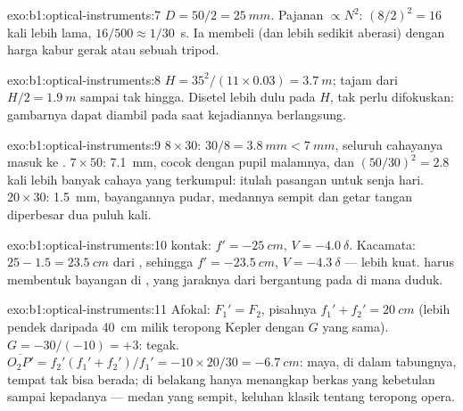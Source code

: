 \begin{solution}{exo:b1:optical-instruments:7}
$D = 50/2 = \qty{25}{mm}$. Pajanan $\propto N^2$: $(8/2)^2 = 16$ kali
lebih lama, $16/500 \approx 1/30$~\unit{s}. Ia membeli 
(dan lebih sedikit aberasi) dengan harga kabur gerak atau sebuah tripod.
\end{solution}

\begin{solution}{exo:b1:optical-instruments:8}
$H = 35^2/(11 \times 0.03) = \qty{3.7}{m}$; tajam dari $H/2 =
\qty{1.9}{m}$ sampai tak hingga. Disetel lebih dulu pada $H$, 
tak perlu difokuskan: gambarnya dapat diambil pada saat kejadiannya berlangsung.
\end{solution}

\begin{solution}{exo:b1:optical-instruments:9}
$8\times30$:  $30/8 = \qty{3.8}{mm} < \qty{7}{mm}$,
seluruh cahayanya masuk ke . $7\times50$: \qty{7.1}{mm}, cocok dengan
pupil malamnya, dan $(50/30)^2 = 2.8$ kali lebih banyak cahaya yang
terkumpul: itulah pasangan untuk senja hari. $20\times30$:  \qty{1.5}{mm}, bayangannya pudar, medannya sempit dan getar
tangan diperbesar dua puluh kali.
\end{solution}

\begin{solution}{exo:b1:optical-instruments:10}
 kontak: $f' = \qty{-25}{cm}$, $V = \qty{-4.0}{\delta}$. Kacamata:
 $25 - 1.5 = \qty{23.5}{cm}$ dari , sehingga $f' =
\qty{-23.5}{cm}$, $V = \qty{-4.3}{\delta}$ --- lebih kuat. 
harus membentuk bayangan di  , yang jaraknya dari
 bergantung pada di mana  duduk.
\end{solution}

\begin{solution}{exo:b1:optical-instruments:11}
Afokal: $F_1' = F_2$, pisahnya $f_1' + f_2' = \qty{20}{cm}$ (lebih pendek
daripada \qty{40}{cm} milik teropong Kepler dengan $G$ yang sama).
$G = -30/(-10) =
+3$: tegak.  $\overline{O_2P'} = f_2'(f_1' + f_2')/f_1' =
-10 \times 20/30 = \qty{-6.7}{cm}$: maya, di dalam tabungnya, tempat
 tak bisa berada;  di belakang  hanya menangkap
berkas yang kebetulan sampai kepadanya --- medan yang sempit, keluhan
klasik tentang teropong opera.
\end{solution}

